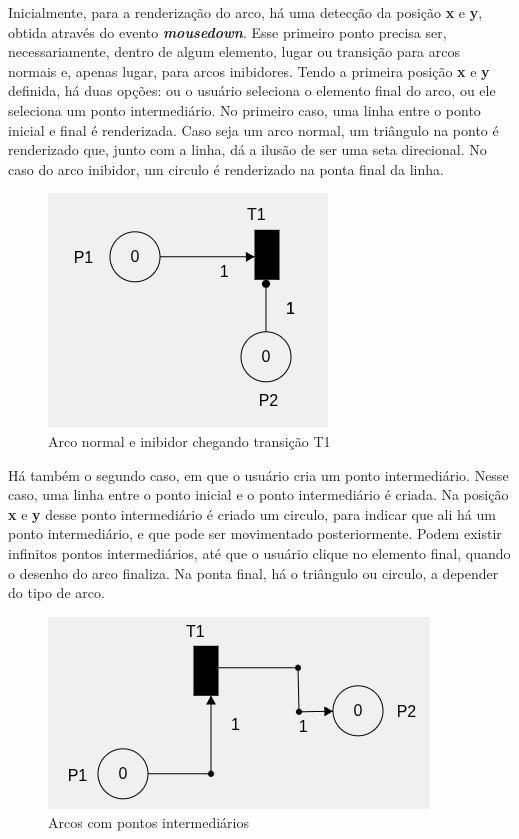 \documentclass[
	12pt,				%
	openright,			%
	oneside,			%
	a4paper,			%
	english,			%
	brazil				%
	]{abntex2}
\begin{document}


Inicialmente, para a renderização do arco, há uma detecção da posição \textbf{x} e \textbf{y}, obtida através do evento \textbf{\textit{mousedown}}. Esse primeiro ponto precisa ser, necessariamente, dentro de algum elemento, lugar ou transição para arcos normais e, apenas lugar, para arcos inibidores. Tendo a primeira posição \textbf{x} e \textbf{y} definida, há duas opções: ou o usuário seleciona o elemento final do arco, ou ele seleciona um ponto intermediário. No primeiro caso, uma linha entre o ponto inicial e final é renderizada. Caso seja um arco normal, um triângulo na ponto é renderizado que, junto com a linha, dá a ilusão de ser uma seta direcional. No caso do arco inibidor, um circulo é renderizado na ponta final da linha. 

\begin{figure}[ht] 
	\centering
	\includegraphics[scale=0.7]{figuras/arcNormalInibidor.png}
	\caption[Arco normal e inibidor]{Arco normal e inibidor chegando transição T1}
	\label{fig:arcNormalInibidor}
\end{figure}

Há também o segundo caso, em que o usuário cria um ponto intermediário. Nesse caso, uma linha entre o ponto inicial e o ponto intermediário é criada. Na posição \textbf{x} e \textbf{y} desse ponto intermediário é criado um circulo, para indicar que ali há um ponto intermediário, e que pode ser movimentado posteriormente. Podem existir infinitos pontos intermediários, até que o usuário clique no elemento final, quando o desenho do arco finaliza. Na ponta final, há o triângulo ou circulo, a depender do tipo de arco. 

\begin{figure}[ht] 
	\centering
	\includegraphics[scale=0.8]{figuras/arcPontoIntermediario.png}
	\caption[Arco com pontos intermediários]{Arcos com pontos intermediários}
	\label{fig:arcPontoIntermediario}
\end{figure}
\end{document}
